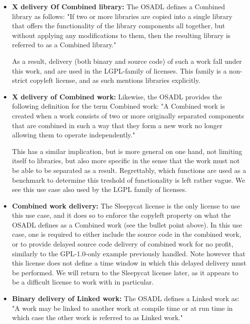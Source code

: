 \begin{itemize}
	\item \textbf{X delivery Of Combined library:} The OSADL defines a Combined library as follows: "If two or more libraries are copied into a single library that offers the functionality of the library components all together, but without applying any modifications to them, then the resulting library is referred to as a Combined library."
	
	As a result, delivery (both binary and source code) of such a work fall under this work, and are used in the LGPL-family of licenses. This family is a non-strict copyleft license, and as such mentions libraries explicitly.
	
	\item \textbf{X delivery of Combined work:} Likewise, the OSADL provides the following definition for the term Combined work: "A Combined work is created when a work consists of two or more originally separated components that are combined in such a way that they form a new work no longer allowing them to operate independently."
	
	This has a similar implication, but is more general on one hand, not limiting itself to libraries, but also more specific in the sense that the work must not be able to be separated as a result. Regrettably, which functions are used as a benchmark to determine this treshold of functionality is left rather vague. We see this use case also used by the LGPL family of licenses.
	
	\item \textbf{Combined work delivery:} The Sleepycat license is the only license to use this use case, and it does so to enforce the copyleft property on what the OSADL defines as a Combined work (see the bullet point above). In this use case, one is required to either include the source code in the combined work, or to provide delayed source code delivery of combined work for no profit, similarly to the GPL-1.0-only example previously handled. Note however that this license does not define a time window in which this delayed delivery must be performed. We will return to the Sleepycat license later, as it appears to be a difficult license to work with in particular.
	
	\item \textbf{Binary delivery of Linked work:} The OSADL defines a Linked work as: "A work may be linked to another work at compile time or at run time in which case the other work is referred to as Linked work."
	

\end{itemize}
